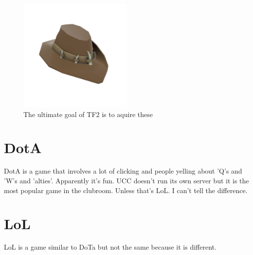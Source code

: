 \begin{figure}[H]
	\centering
	\includegraphics[width=0.5\textwidth]{figures/tf2_hat.png}
	\caption{The ultimate goal of TF2 is to aquire these}
	\label{tf2_hat.png}
\end{figure}

\section{DotA}
DotA is a game that involves a lot of clicking and people yelling about 'Q's and 'W's and 'alties'. Apparently it's fun. UCC doesn't run its own server but it is the most popular game in the clubroom. Unless that's LoL. I can't tell the difference.

\section{LoL}
LoL is a game similar to DoTa but not the same because it is different.
